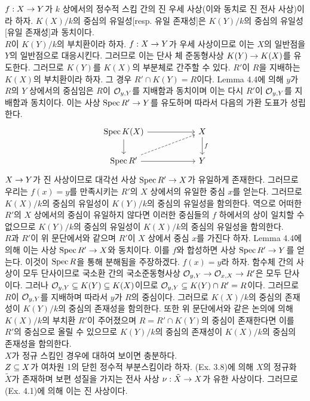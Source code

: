 \begin{enumerate}[label=\tb{4.\arabic*.},itemindent=0mm,itemsep=4mm]
	 $f:X\rightarrow Y$가 $k$ 상에서의 정수적 스킴 간의 진 우세 사상(이와 동치로 진 전사 사상)이라 하자.
	$K(X)/k$의 중심의 유일성[resp. 유일 존재성]은 $K(Y)/k$의 중심의 유일성[유일 존재성]과 동치이다.\\
	$R$이 $K(Y)/k$의 부치환이라 하자. $f:X\rightarrow Y$가 우세 사상이므로 이는 $X$의 일반점을 $Y$의 일반점으로 대응시킨다.
	그러므로 이는 단사 체 준동형사상 $K(Y)\rightarrow K(X)$를 유도한다. 그러므로 $K(Y)$를 $K(X)$의 부분체로 간주할 수 있다.
	$R'$이 $R$을 지배하는 $K(X)$의 부치환이라 하자. 그 경우 $R'\cap K(Y)=R$이다.
	Lemma 4.4에 의해 $y$가 $R$의 $Y$ 상에서의 중심임은 $R$이 $\mathcal{O}_{y,Y}$를 지배함과 동치이며
	이는 다시 $R'$이 $\mathcal{O}_{y,Y}$를 지배함과 동치이다.
	이는 사상 $\operatorname{Spec} R'\rightarrow Y$를 유도하며 따라서 다음의 가환 도표가 성립한다.
	$$\begin{tikzcd}[column sep=2cm]\Spec K(X)\arrow[d]\arrow[r]&X\arrow[d,"f"]\\
	\Spec R'\arrow[r]\arrow[dashed,ur]&Y\end{tikzcd}$$
	$X\rightarrow Y$가 진 사상이므로 대각선 사상 $\operatorname{Spec} R'\rightarrow X$가 유일하게 존재한다.
	그러므로 우리는 $f(x)=y$를 만족시키는 $R'$의 $X$ 상에서의 유일한 중심 $x$를 얻는다.
	그러므로 $K(X)/k$의 중심의 유일성이 $K(Y)/k$의 중심의 유일성을 함의한다.
	역으로 어떠한 $R'$의 $X$ 상에서의 중심이 유일하지 않다면 이러한 중심들의 $f$ 하에서의 상이 일치할 수 없으므로
	$K(Y)/k$의 중심의 유일성이 $K(X)/k$의 중심의 유일성을 함의한다.\\
	$R$과 $R'$이 위 문단에서와 같으며 $R'$이 $X$ 상에서 중심 $x$를 가진다 하자.
	Lemma 4.4에 의해 이는 사상 $\operatorname{Spec} R'\rightarrow X$와 동치이다. 이를 $f$와 합성하면 사상 $\operatorname{Spec} R'\rightarrow Y$를 얻는다.
	이것이 $\operatorname{Spec} R$을 통해 분해됨을 주장하겠다. $f(x)=y$라 하자.
	함수체 간의 사상이 모두 단사이므로 국소환 간의 국소준동형사상 $\mathcal{O}_{y,Y}\rightarrow\mathcal{O}_{x,X}\rightarrow R'$은 모두 단사이다.
	그러나 $\mathcal{O}_{y,Y}\subseteq K(Y)\subseteq K(X)$이므로 $\mathcal{O}_{y,Y}\subseteq K(Y)\cap R'=R$이다.
	그러므로 $R$이 $\mathcal{O}_{y,Y}$를 지배하며 따라서 $y$가 $R$의 중심이다.
	그러므로 $K(X)/k$의 중심의 존재성이 $K(Y)/k$의 중심의 존재성을 함의한다.
	또한 위 문단에서와 같은 논의에 의해 $K(X)/k$의 부치환 $R'$이 주어졌으며 $R=R'\cap K(Y)$의 중심이 존재한다면
	이를 $R'$의 중심으로 올릴 수 있으므로 $K(Y)/k$의 중심의 존재성이 $K(X)/k$의 중심의 존재성을 함의한다.\\[2mm]
	 $X$가 정규 스킴인 경우에 대하여 보이면 충분하다.\\
	$Z\subseteq X$가 여차원 1의 닫힌 정수적 부분스킴이라 하자.
	(Ex. 3.8)에 의해 $X$의 정규화 $\tilde X$가 존재하며
	보편 성질을 가지는 전사 사상 $\nu:\tilde X\rightarrow X$가 유한 사상이다. 그러므로 (Ex. 4.1)에 의해 이는 진 사상이다.

\end{enumerate}
